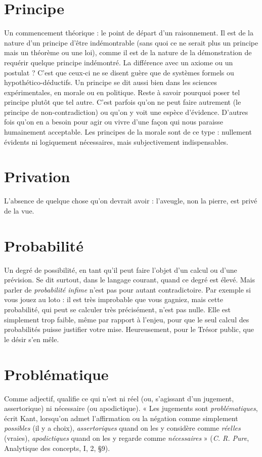 \section{Principe}
Un commencement théorique : le point de départ d’un raisonnement.
Il est de la nature d’un principe d’être indémontrable
(sans quoi ce ne serait plus un principe mais un théorème ou une loi), comme
il est de la nature de la démonstration de requérir quelque principe indémontré.
La différence avec un axiome ou un postulat ? C’est que ceux-ci ne se
disent guère que de systèmes formels ou hypothético-déductifs. Un principe se
dit aussi bien dans les sciences expérimentales, en morale ou en politique. Reste
à savoir pourquoi poser tel principe plutôt que tel autre. C’est parfois qu’on ne
peut faire autrement (le principe de non-contradiction) ou qu’on y voit une
espèce d’évidence. D’autres fois qu’on en a besoin pour agir ou vivre d’une
façon qui nous paraisse humainement acceptable. Les principes de la morale
sont de ce type : nullement évidents ni logiquement nécessaires, mais subjectivement
indispensables.

\section{Privation}
L'absence de quelque chose qu’on devrait avoir : l’aveugle,
non la pierre, est privé de la vue.

\section{Probabilité}
Un degré de possibilité, en tant qu’il peut faire l’objet d’un
calcul ou d’une prévision. Se dit surtout, dans le langage
courant, quand ce degré est élevé. Mais parler de {\it probabilité infime} n’est pas
pour autant contradictoire. Par exemple si vous jouez au loto : il est très improbable
que vous gagniez, mais cette probabilité, qui peut se calculer très précisément,
n’est pas nulle. Elle est simplement trop faible, même par rapport à
l'enjeu, pour que le seul calcul des probabilités puisse justifier votre mise. Heureusement,
pour le Trésor public, que le désir s’en mêle.

\section{Problématique}
Comme adjectif, qualifie ce qui n’est ni réel (ou,
s'agissant d’un jugement, assertorique) ni nécessaire
(ou apodictique). « Les jugements sont {\it problématiques}, écrit Kant, lorsqu'on
admet l’affirmation ou la négation comme simplement {\it possibles} (il y a choix),
{\it assertoriques} quand on les y considère comme {\it réelles} (vraies), {\it apodictiques} quand
on les y regarde comme {\it nécessaires} » ({\it C. R. Pure}, Analytique des concepts, I, 2,
\S 9).

